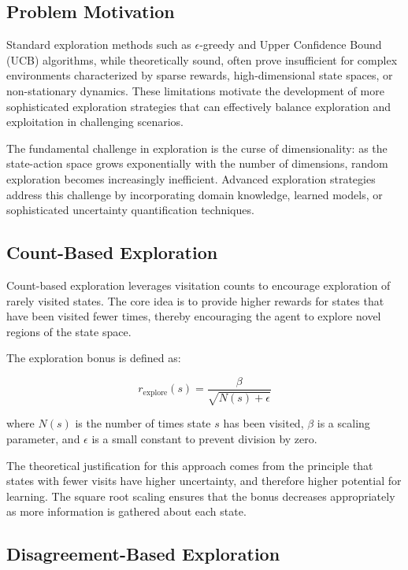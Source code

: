 \documentclass[12pt]{article}
\begin{document}
{{{\subsection{Problem Motivation}

Standard exploration methods such as $\epsilon$-greedy and Upper Confidence Bound (UCB) algorithms, while theoretically sound, often prove insufficient for complex environments characterized by sparse rewards, high-dimensional state spaces, or non-stationary dynamics. These limitations motivate the development of more sophisticated exploration strategies that can effectively balance exploration and exploitation in challenging scenarios.

The fundamental challenge in exploration is the curse of dimensionality: as the state-action space grows exponentially with the number of dimensions, random exploration becomes increasingly inefficient. Advanced exploration strategies address this challenge by incorporating domain knowledge, learned models, or sophisticated uncertainty quantification techniques.

\subsection{Count-Based Exploration}

Count-based exploration leverages visitation counts to encourage exploration of rarely visited states. The core idea is to provide higher rewards for states that have been visited fewer times, thereby encouraging the agent to explore novel regions of the state space.

The exploration bonus is defined as:

\begin{equation}
r_{\text{explore}}(s) = \frac{\beta}{\sqrt{N(s) + \epsilon}}
\end{equation}

where $N(s)$ is the number of times state $s$ has been visited, $\beta$ is a scaling parameter, and $\epsilon$ is a small constant to prevent division by zero.

The theoretical justification for this approach comes from the principle that states with fewer visits have higher uncertainty, and therefore higher potential for learning. The square root scaling ensures that the bonus decreases appropriately as more information is gathered about each state.

\subsection{Disagreement-Based Exploration}

}}}
\end{document}

